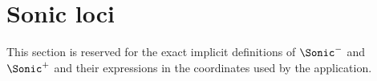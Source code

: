 \section{Sonic loci}

This section is reserved for the exact implicit definitions of $\Sonic^-$ and $\Sonic^+$ and their expressions in the coordinates used by the application.
